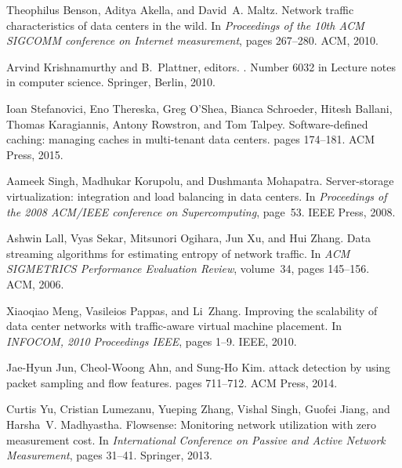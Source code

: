 \begin{thebibliography}{100}
 Theophilus Benson, Aditya Akella, and David~A. Maltz.
\newblock Network traffic characteristics of data centers in the wild.
\newblock In {\em Proceedings of the 10th {ACM} {SIGCOMM} conference on
  {Internet} measurement}, pages 267--280. ACM, 2010.

 Arvind Krishnamurthy and B.~Plattner, editors.
.
\newblock Number 6032 in Lecture notes in computer science. Springer, Berlin,
  2010.

 Ioan Stefanovici, Eno Thereska, Greg O'Shea, Bianca Schroeder, Hitesh Ballani,
  Thomas Karagiannis, Antony Rowstron, and Tom Talpey.
\newblock Software-defined caching: managing caches in multi-tenant data
  centers.
\newblock pages 174--181. ACM Press, 2015.

 Aameek Singh, Madhukar Korupolu, and Dushmanta Mohapatra.
\newblock Server-storage virtualization: integration and load balancing in data
  centers.
\newblock In {\em Proceedings of the 2008 {ACM}/{IEEE} conference on
  {Supercomputing}}, page~53. IEEE Press, 2008.

 Ashwin Lall, Vyas Sekar, Mitsunori Ogihara, Jun Xu, and Hui Zhang.
\newblock Data streaming algorithms for estimating entropy of network traffic.
\newblock In {\em {ACM} {SIGMETRICS} {Performance} {Evaluation} {Review}},
  volume~34, pages 145--156. ACM, 2006.

 Xiaoqiao Meng, Vasileios Pappas, and Li~Zhang.
\newblock Improving the scalability of data center networks with traffic-aware
  virtual machine placement.
\newblock In {\em {INFOCOM}, 2010 {Proceedings} {IEEE}}, pages 1--9. IEEE,
  2010.

 Jae-Hyun Jun, Cheol-Woong Ahn, and Sung-Ho Kim.
 attack detection by using packet sampling and flow features.
\newblock pages 711--712. ACM Press, 2014.

 Curtis Yu, Cristian Lumezanu, Yueping Zhang, Vishal Singh, Guofei Jiang, and
  Harsha~V. Madhyastha.
\newblock Flowsense: {Monitoring} network utilization with zero measurement
  cost.
\newblock In {\em International {Conference} on {Passive} and {Active}
  {Network} {Measurement}}, pages 31--41. Springer, 2013.


\end{thebibliography}
